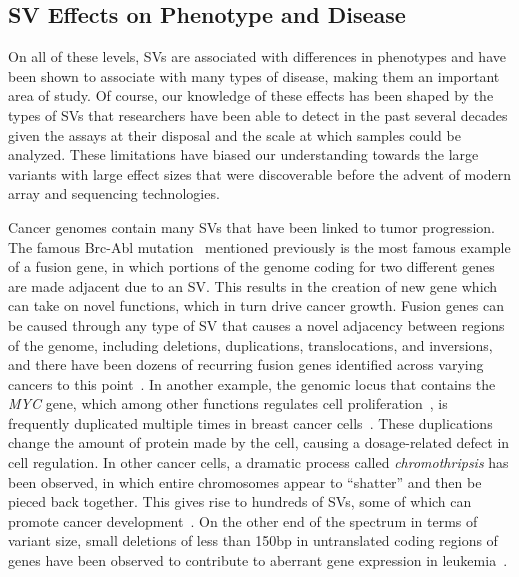 \subsection{SV Effects on Phenotype and Disease}

On all of these levels, SVs are associated with differences in phenotypes and have been shown to associate with many types of disease, making them an important area of study. Of course, our knowledge of these effects has been shaped by the types of SVs that researchers have been able to detect in the past several decades given the assays at their disposal and the scale at which samples could be analyzed. These limitations have biased our understanding towards the large variants with large effect sizes that were discoverable before the advent of modern array and sequencing technologies. 

Cancer genomes contain many SVs that have been linked to tumor progression. The famous Brc-Abl mutation~\cite{Kurzrock:2003bz} mentioned previously is the most famous example of a fusion gene, in which portions of the genome coding for two different genes are made adjacent due to an SV. This results in the creation of new gene which can take on novel functions, which in turn drive cancer growth. Fusion genes can be caused through any type of SV that causes a novel adjacency between regions of the genome, including deletions, duplications, translocations, and inversions, and there have been dozens of recurring fusion genes identified across varying cancers to this point~\cite{Annala:2013ks}. In another example, the genomic locus that contains the \emph{MYC} gene, which among other functions regulates cell proliferation~\cite{Eilers:2008jk}, is frequently duplicated multiple times in breast cancer cells~\cite{Escot:1986tn}. These duplications change the amount of protein made by the cell, causing a dosage-related defect in cell regulation. In other cancer cells, a dramatic process called \emph{chromothripsis} has been observed, in which entire chromosomes appear to ``shatter'' and then be pieced back together. This gives rise to hundreds of SVs, some of which can promote cancer development~\cite{Stephens:2011bm}. On the other end of the spectrum in terms of variant size, small deletions of less than 150bp in untranslated coding regions of genes have been observed to contribute to aberrant gene expression in leukemia~\cite{Hosokawa:1998wi}.


